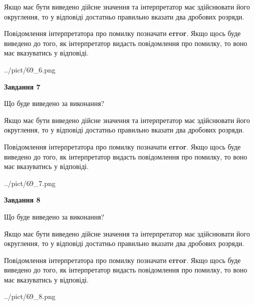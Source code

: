 \documentclass[12pt, ukrainian]{article}
\begin{document}
{\begin {Large}
Якщо має бути виведено дійсне значення та інтерпретатор має здійснювати його округлення, 
то у відповіді достатньо правильно вказати два дробових розряди.

Повідомлення інтерпретатора про помилку позначати \textbf{error}.
Якщо щось буде виведено до того, як інтерпретатор видасть повідомлення про помилку, 
то воно має вказуватись у відповіді. \par

\begin{center}
	{../pict/69_6.png}
\end{center}
\newpage

{\begin {center}\textbf{Завдання 7}\end {center}}\par
Що буде виведено за виконання? \par

Якщо має бути виведено дійсне значення та інтерпретатор має здійснювати його округлення, 
то у відповіді достатньо правильно вказати два дробових розряди.

Повідомлення інтерпретатора про помилку позначати \textbf{error}.
Якщо щось буде виведено до того, як інтерпретатор видасть повідомлення про помилку, 
то воно має вказуватись у відповіді. \par

\begin{center}
	{../pict/69_7.png}
\end{center}
\newpage

{\begin {center}\textbf{Завдання 8}\end {center}}\par
Що буде виведено за виконання? \par

Якщо має бути виведено дійсне значення та інтерпретатор має здійснювати його округлення, 
то у відповіді достатньо правильно вказати два дробових розряди.

Повідомлення інтерпретатора про помилку позначати \textbf{error}.
Якщо щось буде виведено до того, як інтерпретатор видасть повідомлення про помилку, 
то воно має вказуватись у відповіді. \par

\begin{center}
	{../pict/69_8.png}
\end{center}
\newpage


\end{Large}}
\end{document}
